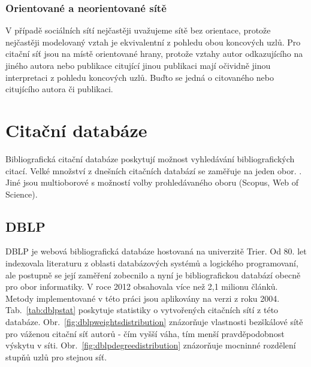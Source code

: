 \documentclass{bakalarka}
\begin{document}
\subsection{Orientované a neorientované sítě}
V případě sociálních sítí nejčastěji uvažujeme sítě bez orientace, protože
nejčastěji modelovaný vztah  je ekvivalentní z pohledu obou
koncových uzlů. Pro citační síť jsou na místě orientované hrany, protože vztahy
autor odkazujícího na jiného autora nebo publikace citující jinou publikaci
mají očividně jinou interpretaci z pohledu koncových uzlů. Buďto se jedná o
citovaného nebo citujícího autora či publikaci.


\chapter{Citační databáze}
Bibliografická citační databáze poskytují možnost vyhledávání bibliografických
citací. Velké množství z dnešních citačních databází se zaměřuje na jeden obor.
\citep{libraryamnh}.  Jiné jsou multioborové s možností volby prohledávaného
oboru (Scopus, Web of Science).

\section{DBLP}
DBLP \citep{DBLP} je webová bibliografická databáze hostovaná na univerzitě
Trier. Od 80. let indexovala literaturu z oblasti databázových systémů a
logického programovaní, ale postupně se její zaměření zobecnilo a nyní je
bibliografickou databází obecně pro obor informatiky. 
V roce 2012 obsahovala více než 2,1 milionu článků. Metody implementované v
této práci jsou aplikovány na verzi z roku 2004. 
Tab.~\ref{tab:dblpstat} poskytuje statistiky o vytvořených citačních sítí z
této databáze. Obr.~\ref{fig:dblpweightsdistribution} znázorňuje vlastnosti
bezškálové sítě pro váženou citační síť autorů - čím vyšší váha, tím menší
pravděpodobnost výskytu v síti. Obr.~\ref{fig:dblpdegreedistribution} znázorňuje
mocninné rozdělení stupňů uzlů pro stejnou síť.
\end{document}
